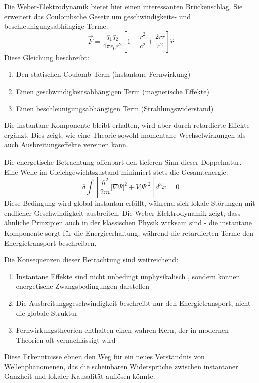 Die Weber-Elektrodynamik bietet hier einen interessanten Brückenschlag. Sie erweitert das Coulombsche Gesetz um geschwindigkeits- und beschleunigungsabhängige Terme:
\begin{equation}
    \label{eq:weber_em}
    \vec{F} = \frac{q_1q_2}{4\pi\epsilon_0r^2}\left[1 - \frac{\dot{r}^2}{c^2} + \frac{2r\ddot{r}}{c^2}\right]\hat{r}
\end{equation}
Diese Gleichung beschreibt:
\begin{enumerate}
    \item Den statischen Coulomb-Term (instantane Fernwirkung)
    \item Einen geschwindigkeitsabhängigen Term (magnetische Effekte)
    \item Einen beschleunigungsabhängigen Term (Strahlungswiderstand)
\end{enumerate}
Die instantane Komponente bleibt erhalten, wird aber durch retardierte Effekte ergänzt. Dies zeigt, wie eine Theorie sowohl momentane Wechselwirkungen als auch Ausbreitungseffekte vereinen kann.

Die energetische Betrachtung offenbart den tieferen Sinn dieser Doppelnatur. Eine Welle im Gleichgewichtszustand minimiert stets die Gesamtenergie:
\[
    \delta \int \left[\frac{\hbar^2}{2m}|\nabla\Psi|^2 + V|\Psi|^2\right] d^3x = 0
\]
Diese Bedingung wird global instantan erfüllt, während sich lokale Störungen mit endlicher Geschwindigkeit ausbreiten. Die Weber-Elektrodynamik zeigt, dass ähnliche Prinzipien auch in der
klassischen Physik wirksam sind - die instantane Komponente sorgt für die Energieerhaltung, während die retardierten Terme den Energietransport beschreiben.

Die Konsequenzen dieser Betrachtung sind weitreichend:
\begin{enumerate}
    \item Instantane Effekte sind nicht unbedingt unphysikalisch \cite{Bunge1971}, sondern können energetische Zwangsbedingungen darstellen
    \item Die Ausbreitungsgeschwindigkeit beschreibt nur den Energietransport, nicht die globale Struktur
    \item Fernwirkungstheorien enthalten einen wahren Kern, der in modernen Theorien oft vernachlässigt wird
\end{enumerate}
Diese Erkenntnisse ebnen den Weg für ein neues Verständnis von Wellenphänomenen, das die scheinbaren Widersprüche zwischen instantaner Ganzheit und lokaler Kausalität auflösen könnte.

